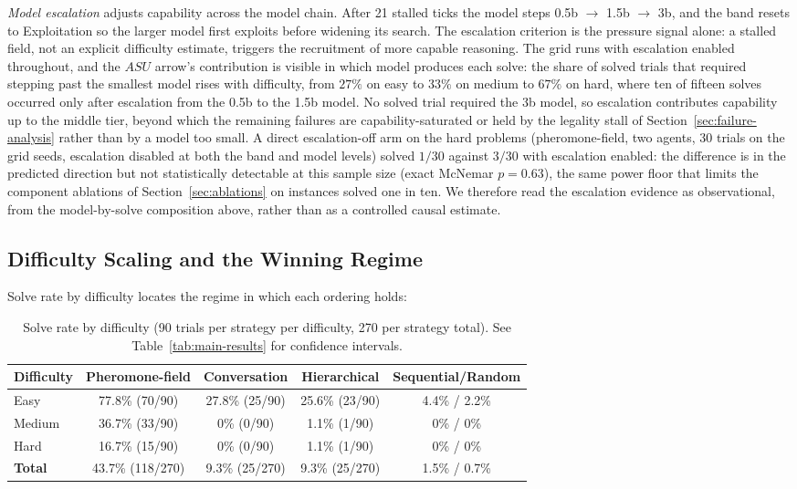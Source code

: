 \emph{Model escalation} adjusts capability across the model chain. After 21 stalled ticks the model steps 0.5b $\to$ 1.5b $\to$ 3b, and the band resets to Exploitation so the larger model first exploits before widening its search. The escalation criterion is the pressure signal alone: a stalled field, not an explicit difficulty estimate, triggers the recruitment of more capable reasoning. The grid runs with escalation enabled throughout, and the $ASU$ arrow's contribution is visible in which model produces each solve: the share of solved trials that required stepping past the smallest model rises with difficulty, from $27\%$ on easy to $33\%$ on medium to $67\%$ on hard, where ten of fifteen solves occurred only after escalation from the 0.5b to the 1.5b model. No solved trial required the 3b model, so escalation contributes capability up to the middle tier, beyond which the remaining failures are capability-saturated or held by the legality stall of Section~\ref{sec:failure-analysis} rather than by a model too small. A direct escalation-off arm on the hard problems (pheromone-field, two agents, 30 trials on the grid seeds, escalation disabled at both the band and model levels) solved $1/30$ against $3/30$ with escalation enabled: the difference is in the predicted direction but not statistically detectable at this sample size (exact McNemar $p = 0.63$), the same power floor that limits the component ablations of Section~\ref{sec:ablations} on instances solved one in ten. We therefore read the escalation evidence as observational, from the model-by-solve composition above, rather than as a controlled causal estimate.

\subsection{Difficulty Scaling and the Winning Regime}
\label{sec:difficulty}

Solve rate by difficulty locates the regime in which each ordering holds:

\begin{table}[htbp]
\centering
\small
\begin{tabular}{@{}lcccc@{}}
\toprule
\textbf{Difficulty} & \textbf{Pheromone-field} & \textbf{Conversation} & \textbf{Hierarchical} & \textbf{Sequential/Random} \\
\midrule
Easy & 77.8\% (70/90) & 27.8\% (25/90) & 25.6\% (23/90) & 4.4\% / 2.2\% \\
Medium & 36.7\% (33/90) & 0\% (0/90) & 1.1\% (1/90) & 0\% / 0\% \\
Hard & 16.7\% (15/90) & 0\% (0/90) & 1.1\% (1/90) & 0\% / 0\% \\
\midrule
\textbf{Total} & 43.7\% (118/270) & 9.3\% (25/270) & 9.3\% (25/270) & 1.5\% / 0.7\% \\
\bottomrule
\end{tabular}
\caption{Solve rate by difficulty (90 trials per strategy per difficulty, 270 per strategy total). See Table~\ref{tab:main-results} for confidence intervals.}
\label{tab:difficulty}
\end{table}

